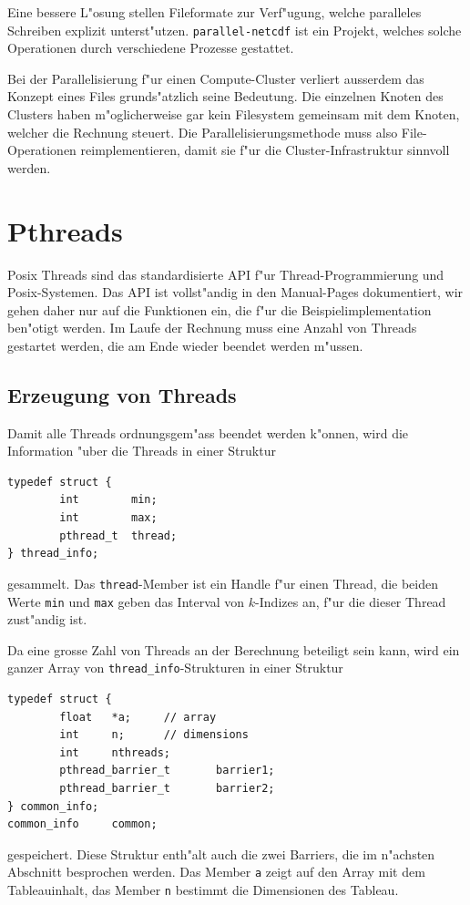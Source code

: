 Eine bessere L"osung stellen Fileformate zur Verf"ugung, welche paralleles
Schreiben explizit unterst"utzen. {\tt parallel-netcdf} ist ein Projekt,
welches solche Operationen durch verschiedene Prozesse gestattet.

Bei der Parallelisierung f"ur einen Compute-Cluster verliert ausserdem
das Konzept eines Files grunds"atzlich seine Bedeutung.
Die einzelnen Knoten des Clusters haben m"oglicherweise gar kein Filesystem
gemeinsam mit dem Knoten, welcher die Rechnung steuert. 
Die Parallelisierungsmethode muss also File-Operationen reimplementieren,
damit sie f"ur die Cluster-Infrastruktur sinnvoll werden.

\section{Pthreads}
Posix Threads sind das standardisierte API f"ur Thread-Programmierung
und Posix-Systemen.
Das API ist vollst"andig in den Manual-Pages dokumentiert, wir gehen
daher nur auf die Funktionen ein, die f"ur die Beispielimplementation
ben"otigt werden. Im Laufe der Rechnung muss eine Anzahl von Threads
gestartet werden, die am Ende wieder beendet werden m"ussen.

\subsection{Erzeugung von Threads}
Damit alle Threads ordnungsgem"ass beendet werden k"onnen, wird die Information
"uber die Threads in einer Struktur
\begin{verbatim}
typedef struct {
        int        min;
        int        max;
        pthread_t  thread;
} thread_info;
\end{verbatim}
gesammelt. Das {\tt thread}-Member ist ein Handle f"ur einen Thread, die
beiden Werte {\tt min} und {\tt max} geben das Interval von $k$-Indizes
an, f"ur die dieser Thread zust"andig ist.

Da eine grosse Zahl von Threads an der Berechnung beteiligt sein kann,
wird ein ganzer Array von \verb+thread_info+-Strukturen in einer
Struktur
\begin{verbatim}
typedef struct {
        float   *a;     // array
        int     n;      // dimensions
        int     nthreads;
        pthread_barrier_t       barrier1;
        pthread_barrier_t       barrier2;
} common_info;
common_info     common;
\end{verbatim}
gespeichert. Diese Struktur enth"alt auch die zwei Barriers, die
im n"achsten Abschnitt besprochen werden. Das Member {\tt a}
zeigt auf den Array mit dem Tableauinhalt, das Member {\tt n} 
bestimmt die Dimensionen des Tableau.


